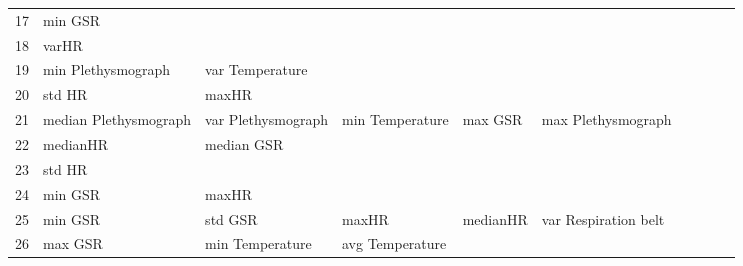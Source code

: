 \begin{landscape}
\begin{table}[]
\begin{tabular}{l|llllllll}
17       & min GSR                 &                       &                         &                         &                         &                       &                      &          &                      &        \\
18       & varHR                   &                       &                         &                         &                         &                       &                      &          &                      &        \\
19       & min Plethysmograph      & var Temperature       &                         &                         &                         &                       &                      &          &                      &        \\
20       & std HR                  & maxHR                 &                         &                         &                         &                       &                      &          &                      &        \\
21       & median Plethysmograph   & var Plethysmograph    & min Temperature         & max GSR                 & max Plethysmograph      &                       &                      &          &                      &        \\
22       & medianHR                & median GSR            &                         &                         &                         &                       &                      &          &                      &        \\
23       & std HR                  &                       &                         &                         &                         &                       &                      &          &                      &        \\
24       & min GSR                 & maxHR                 &                         &                         &                         &                       &                      &          &                      &        \\
25       & min GSR                 & std GSR               & maxHR                   & medianHR                & var Respiration belt    &                       &                      &          &                      &        \\
26       & max GSR                 & min Temperature       & avg Temperature         &                         &                         &                       &                      &          &                      &        \\

\end{tabular}
\end{table}
\end{landscape}

